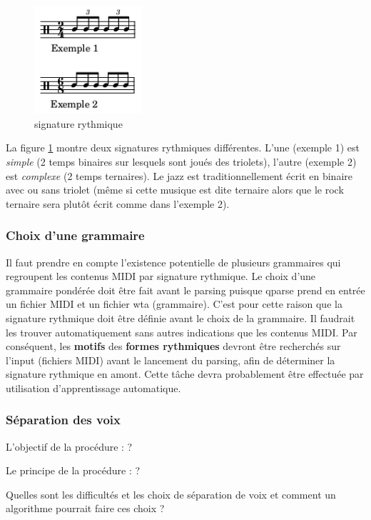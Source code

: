 \begin{figure}[h]
	\centering
	\includegraphics[height=40mm, width=40mm]{
    z_images/3_methodes/2_systemes/0_simple_VS_complexe.png}
	\caption{signature rythmique}
	\label{subdivisions}
\end{figure} %

La figure \ref{subdivisions} montre deux signatures rythmiques différentes. 
L’une (exemple 1) est \textit{simple} (2 temps binaires sur lesquels sont joués
des triolets), l’autre (exemple 2) est \textit{complexe} (2 temps ternaires). 
Le jazz est traditionnellement écrit en binaire avec ou sans triolet (même si
cette musique est dite ternaire alors que le rock ternaire sera plutôt écrit
comme dans l’exemple 2).

\subsubsection{Choix d’une grammaire}
Il faut prendre en compte l’existence potentielle de plusieurs grammaires
qui regroupent les contenus MIDI par signature rythmique. Le choix d’une
grammaire pondérée doit être fait avant le parsing puisque qparse prend en
entrée un fichier MIDI et un fichier wta (grammaire). C’est pour cette raison
que la signature rythmique doit être définie avant le choix de la grammaire.
Il faudrait les trouver automatiquement sans autres indications que les
contenus MIDI. Par conséquent, les \textbf{motifs} des
\textbf{formes rythmiques} devront être recherchés sur l’input (fichiers MIDI)
avant le lancement du parsing, afin de déterminer la signature rythmique en
amont. Cette tâche devra probablement être effectuée par utilisation
d'apprentissage automatique.


\subsubsection{Séparation des voix}

L’objectif de la procédure : ?

Le principe de la procédure : ?

Quelles sont les difficultés et les choix de séparation de voix et comment un
algorithme pourrait faire ces choix ?

